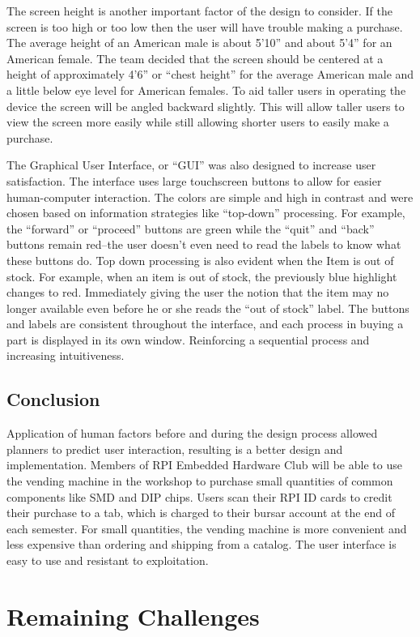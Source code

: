 \documentclass[12pt,draft,oneside]{article}
\begin{document}
The screen height is another important factor of the design to consider. If the screen is too high or too low then the user will have trouble making a purchase. The average height of an American male is about 5'10'' and about 5'4'' for an American female. The team decided that the screen should be centered at a height of approximately 4'6'' or ``chest height'' for the average American male and a little below eye level for American females. To aid taller users in operating the device the screen will be angled backward slightly. This will allow taller users to view the screen more easily while still allowing shorter users to easily make a purchase.

The Graphical User Interface, or ``GUI'' was also designed to increase user satisfaction. The interface uses large touchscreen buttons to allow for easier human-computer interaction. The colors are simple and high in contrast and were chosen based on information strategies like ``top-down'' processing. For example, the ``forward'' or ``proceed'' buttons are green while the ``quit'' and ``back'' buttons remain red--the user doesn't even need to read the labels to know what these buttons do. Top down processing is also evident when the Item is out of stock. For example, when an item is out of stock, the previously blue highlight changes to red. Immediately giving the user the notion that the item may no longer available even before he or she reads the ``out of stock'' label. The buttons and labels are consistent throughout the interface, and each process in buying a part is displayed in its own window. Reinforcing a sequential process and increasing intuitiveness.

\subsection{Conclusion}
Application of human factors before and during the design process allowed planners to predict user interaction, resulting is a better design and implementation. Members of RPI Embedded Hardware Club will be able to use the vending machine in the workshop to purchase small quantities of common components like SMD and DIP chips. Users scan their RPI ID cards to credit their purchase to a tab, which is charged to their bursar account at the end of each semester. For small quantities, the vending machine is more convenient and less expensive than ordering and shipping from a catalog. The user interface is easy to use and resistant to exploitation.


\section{Remaining Challenges}
\label{sec:challenges}
\end{document}
